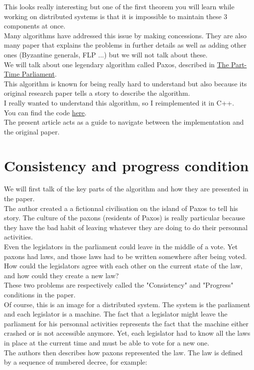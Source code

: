 \documentclass{article}
\begin{document}
This looks really interesting but one of the first theorem you will learn while working on distributed systems is that it is impossible to maintain these 3 components at once.\\
Many algorithms have addressed this issue by making concessions. They are also many paper that explains the problems in further details as well as adding other ones (Byzantine generals, FLP ...) but we will not talk about these.\\
We will talk about one legendary algorithm called Paxos, described in \href{https://lamport.azurewebsites.net/pubs/lamport-paxos.pdf}{The Part-Time Parliament}.\\
This algorithm is known for being really hard to understand but also because its original research paper tells a story to describe the algorithm.\\
I really wanted to understand this algorithm, so I reimplemented it in C++.\\
You can find the code \href{https://github.com/Azomasiel/paxos}{here}.\\
The present article acts as a guide to navigate between the implementation and the original paper.
\pagebreak

\section{Consistency and progress condition}
We will first talk of the key parts of the algorithm and how they are presented in the paper.\\
The author created a a fictionnal civilisation on the island of Paxos to tell his story. The culture of the paxons (residents of Paxos) is really particular because they have the bad habit of leaving whatever they are doing to do their personnal activities.\\
Even the legislators in the parliament could leave in the middle of a vote. Yet paxons had laws, and those laws had to be written somewhere after being voted. How could the legislators agree with each other on the current state of the law, and how could they create a new law?\\
These two problems are respectively called the "Consistency" and "Progress" conditions in the paper.\\
Of course, this is an image for a distributed system. The system is the parliament and each legislator is a machine. The fact that a legislator might leave the parliament for his personnal activities represents the fact that the machine either crashed or is not accessible anymore. Yet, each legislator had to know all the laws in place at the current time and must be able to vote for a new one.\\
The authors then describes how paxons represented the law. The law is defined by a sequence of numbered decree, for example:
\end{document}
